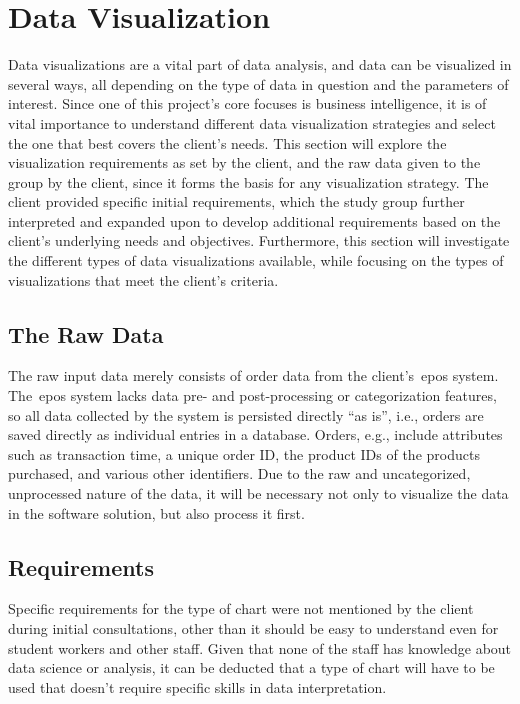 \section{Data Visualization}\label{sec:data-visualization}

Data visualizations are a vital part of data analysis, and data can be visualized in several ways, all depending on the
type of data in question and the parameters of interest.
Since one of this project's core focuses is business intelligence, it is of vital importance to understand different
data visualization strategies and select the one that best covers the client's needs.
This section will explore the visualization requirements as set by the client, and the raw data given to the group by
the client, since it forms the basis for any visualization strategy.
The client provided specific initial requirements, which the study group further interpreted and expanded upon to
develop additional requirements based on the client's underlying needs and objectives.
Furthermore, this section will investigate the different types of data visualizations available, while focusing on the
types of visualizations that meet the client's criteria.

\subsection{The Raw Data}\label{subsec:the-client's-raw-data}
The raw input data merely consists of order data from the client's~\acrshort{epos} system.
The~\acrshort{epos} system lacks data pre- and post-processing or categorization features, so all data collected by the
system is persisted directly ``as is'', i.e., orders are saved directly as individual entries in a database.
Orders, e.g., include attributes such as transaction time, a unique order ID, the product IDs of the products purchased,
and various other identifiers.
Due to the raw and uncategorized, unprocessed nature of the data, it will be necessary not only to visualize the data in
the software solution, but also process it first.

\subsection{Requirements}\label{subsec:requirements}
Specific requirements for the type of chart were not mentioned by the client during initial consultations, other than it
should be easy to understand even for student workers and other staff.
Given that none of the staff has knowledge about data science or analysis, it can be deducted that a type of chart will
have to be used that doesn't require specific skills in data interpretation.

